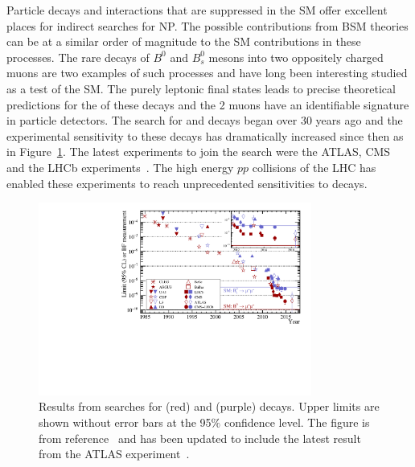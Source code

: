 Particle decays and interactions that are suppressed in the SM offer excellent places for indirect searches for NP. The possible contributions from BSM theories can be at a similar order of magnitude to the SM contributions in these processes. The rare decays of $B^{0}$ and $B^{0}_{s}$ mesons into two oppositely charged muons are two examples of such processes and have long been interesting studied as a test of the SM. The purely leptonic final states leads to precise theoretical predictions for the \BFs of these decays and the 2 muons have an identifiable signature in particle detectors. The search for \bdmumu and \bsmumu decays began over 30 years ago and the experimental sensitivity to these decays has dramatically increased since then as in Figure~\ref{fig:bmumu_history}. The latest experiments to join the search were the ATLAS, CMS and the LHCb experiments~\cite{Aad:2012pn,Aaboud:2016ire, Chatrchyan:2011kr, Chatrchyan:2012rga, Chatrchyan:2013bka, Aaij:2011rja, LHCb:2011ac,Aaij:2012ac,Aaij:2012nna,Aaij:2013aka,CMS:2014xfa}. The high energy $pp$ collisions of the LHC has enabled these experiments to reach unprecedented sensitivities to \bmumu decays. 

\begin{figure}[tbp]
    \centering
        \includegraphics[width=0.8\textwidth]{./Figs/Introduction/95_CL.pdf}
    \caption{Results from searches for \bdmumu (red) and \bsmumu (purple) decays. Upper limits are shown without error bars at the 95$\%$ confidence level. The figure is from reference~\cite{CMS:2014xfa} and has been updated to include the latest result from the ATLAS experiment~\cite{Aaboud:2016ire}.}
    \label{fig:bmumu_history}
\end{figure}

